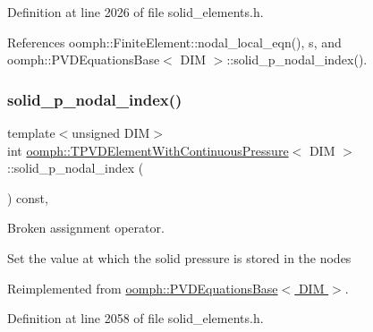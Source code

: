 Definition at line 2026 of file solid\+\_\+elements.\+h.



References oomph\+::\+Finite\+Element\+::nodal\+\_\+local\+\_\+eqn(), s, and oomph\+::\+P\+V\+D\+Equations\+Base$<$ D\+I\+M $>$\+::solid\+\_\+p\+\_\+nodal\+\_\+index().

\mbox{\label{classoomph_1_1TPVDElementWithContinuousPressure_aa39375a80e84e370d1633122e87ad86d}} 
\subsubsection{\texorpdfstring{solid\+\_\+p\+\_\+nodal\+\_\+index()}{solid\_p\_nodal\_index()}}
{\footnotesize\ttfamily template$<$unsigned D\+IM$>$ \\
int \hyperlink{classoomph_1_1TPVDElementWithContinuousPressure}{oomph\+::\+T\+P\+V\+D\+Element\+With\+Continuous\+Pressure}$<$ D\+IM $>$\+::solid\+\_\+p\+\_\+nodal\+\_\+index (\begin{DoxyParamCaption}{ }\end{DoxyParamCaption}) const\hspace{0.3cm}{\ttfamily [inline]}, {\ttfamily [virtual]}}



Broken assignment operator. 

Set the value at which the solid pressure is stored in the nodes 

Reimplemented from \hyperlink{classoomph_1_1PVDEquationsBase_a2f879db96640898f0c6f1fc8823520d8}{oomph\+::\+P\+V\+D\+Equations\+Base$<$ D\+I\+M $>$}.



Definition at line 2058 of file solid\+\_\+elements.\+h.

\mbox{\label{classoomph_1_1TPVDElementWithContinuousPressure_a5bb00d8bab9b92063a4cef340154438d}} 
